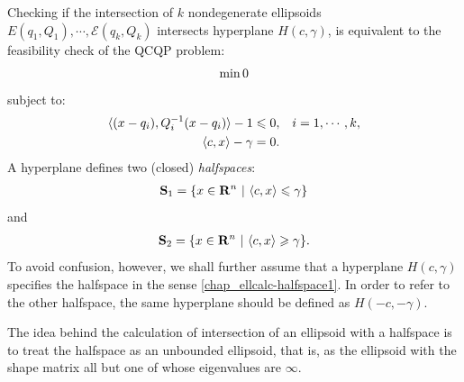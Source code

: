 \documentclass[letterpaper,10pt,english]{sphinxmanual}
\begin{document}
Checking if the intersection of \(k\) nondegenerate ellipsoids
\(E(q_1,Q_1),\cdots,{\mathcal E}(q_k,Q_k)\) intersects hyperplane
\(H(c,\gamma)\), is equivalent to the feasibility check of the QCQP
problem:
\begin{gather}
\begin{split}\min 0\end{split}\notag
\end{gather}
subject to:
\begin{gather}
\begin{split}\begin{aligned}
\langle (x-q_i),Q_i^{-1}(x-q_i)\rangle - 1 \leqslant0, & & i=1,\cdots,k,\\
\langle c, x\rangle - \gamma = 0. & &\end{aligned}\end{split}\notag
\end{gather}
A hyperplane defines two (closed) \emph{halfspaces}:
\label{chap_ellcalc:equation-halfspace1}\begin{gather}
\begin{split}{\bf S}_1 = \{x\in{\bf R}^n ~|~ \langle c, x\rangle \leqslant\gamma\}\end{split}\label{chap_ellcalc-halfspace1}
\end{gather}
and
\label{chap_ellcalc:equation-halfspace2}\begin{gather}
\begin{split}{\bf S}_2 = \{x\in{\bf R}^n ~|~ \langle c, x\rangle \geqslant\gamma\}.\end{split}\label{chap_ellcalc-halfspace2}
\end{gather}
To avoid confusion, however, we shall further assume that a hyperplane
\(H(c,\gamma)\) specifies the halfspace in the sense \eqref{chap_ellcalc-halfspace1}.
In order to refer to the other halfspace, the same hyperplane should be
defined as \(H(-c,-\gamma)\).

The idea behind the calculation of intersection of an ellipsoid with a
halfspace is to treat the halfspace as an unbounded ellipsoid, that is,
as the ellipsoid with the shape matrix all but one of whose eigenvalues
are \(\infty\).
\end{document}
